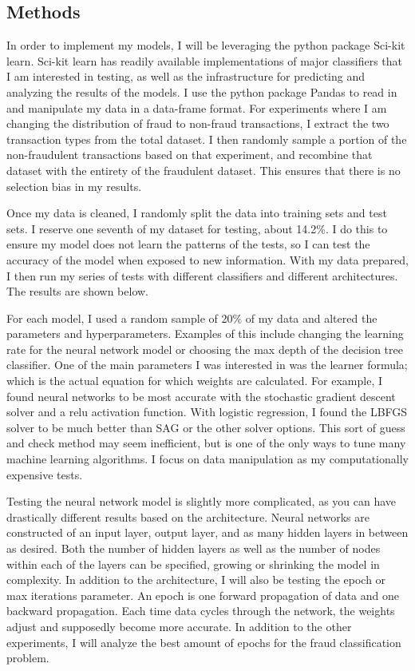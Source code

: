 \documentclass[midd]{thesis}
\begin{document}
\subsection{Methods}

In order to implement my models, I will be leveraging the python package Sci-kit learn. Sci-kit learn has readily available implementations of major classifiers that I am interested in testing, as well as the infrastructure for predicting and analyzing the results of the models. I use the python package Pandas to read in and manipulate my data in a data-frame format. For experiments where I am changing the distribution of fraud to non-fraud transactions, I extract the two transaction types from the total dataset. I then randomly sample a portion of the non-fraudulent transactions based on that experiment, and recombine that dataset with the entirety of the fraudulent dataset. This ensures that there is no selection bias in my results. 

Once my data is cleaned, I randomly split the data into training sets and test sets. I reserve one seventh of my dataset for testing, about 14.2\%. I do this to ensure my model does not learn the patterns of the tests, so I can test the accuracy of the model when exposed to new information. With my data prepared, I then run my series of tests with different classifiers and different architectures. The results are shown below. 

For each model, I used a random sample of 20\% of my data and altered the parameters and hyperparameters. Examples of this include changing the learning rate for the neural network model or choosing the max depth of the decision tree classifier. One of the main parameters I was interested in was the learner formula; which is the actual equation for which weights are calculated. For example, I found neural networks to be most accurate with the stochastic gradient descent solver and a relu activation function. With logistic regression, I found the LBFGS solver to be much better than SAG or the other solver options. This sort of guess and check method may seem inefficient, but is one of the only ways to tune many machine learning algorithms. I focus on data manipulation as my computationally expensive tests. 


Testing the neural network model is slightly more complicated, as you can have drastically different results based on the architecture. Neural networks are constructed of an input layer, output layer, and as many hidden layers in between as desired. Both the number of hidden layers as well as the number of nodes within each of the layers can be specified, growing or shrinking the model in complexity. In addition to the architecture, I will also be testing the epoch or max iterations parameter. An epoch is one forward propagation of data and one backward propagation. Each time data cycles through the network, the weights adjust and supposedly become more accurate. In addition to the other experiments, I will analyze the best amount of epochs for the fraud classification problem.
\end{document}
